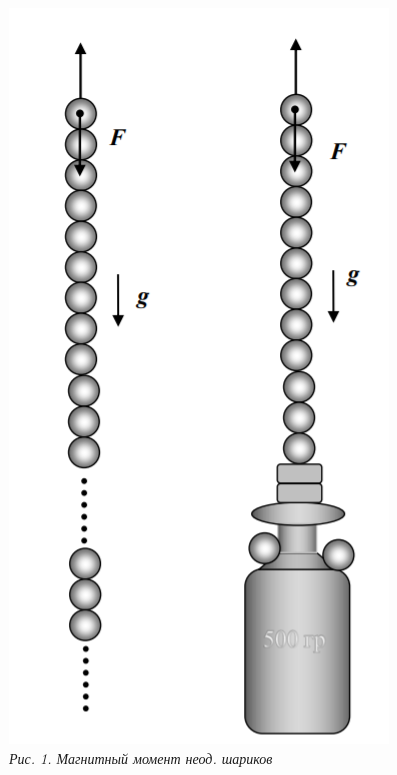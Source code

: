 \begin{center}
\shiftedText{0.1cm}{4.5cm}
{
    \begin{center}

        \includegraphics[scale=0.3]{picks/121-scheme1.png} \\
        \textit{Рис. 1. Магнитный момент неод. шариков}

    \end{center}
}
\shiftedText{0.1cm}{4.5cm}
{
    \begin{center}
    

\end{center}}
\end{center}
